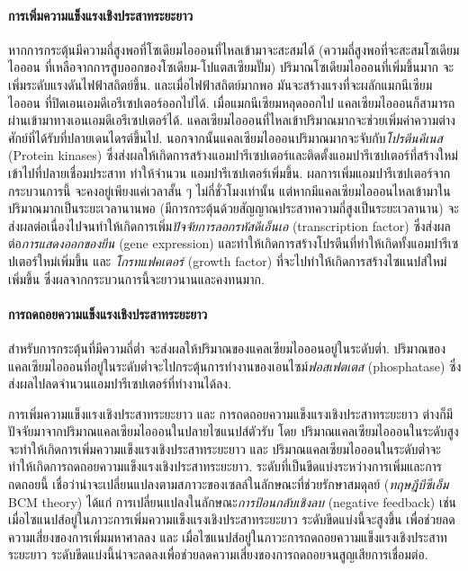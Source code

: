{\begin{shaded}
		\paragraph{\small การเพิ่มความแข็งแรงเชิงประสาทระยะยาว}
		หากการกระตุ้นมีความถี่สูงพอที่โซเดียมไอออนที่ไหลเข้ามาจะสะสมได้ (ความถี่สูงพอที่จะสะสมโซเดียมไอออน ที่เหลือจากการสูบออกของโซเดียม-โปแตสเซียมปั๊ม)
		ปริมาณโซเดียมไอออนที่เพิ่มขึ้นมาก จะเพิ่มระดับแรงดันไฟฟ้าสถิตย์ขึ้น. 
		และเมื่อไฟฟ้าสถิตย์มากพอ มันจะสร้างแรงที่จะผลักแมกนีเซียมไอออน ที่ปิดเอนเอมดีเอรีเซปเตอร์ออกไปได้.
		เมื่อแมกนีเซียมหลุดออกไป แคลเซียมไอออนก็สามารถผ่านเข้ามาทางเอนเอมดีเอรีเซปเตอร์ได้.
		แคลเซียมไอออนที่ไหลเข้าปริมาณมากจะช่วยเพิ่มค่าความต่างศักย์ที่ได้รับที่ปลายเดนไดรต์ขึ้นไป.
		นอกจากนั้นแคลเซียมไอออนปริมาณมากจะจับกับ\textit{โปรตีนคีเนส} (Protein kinases) ซึ่งส่งผลให้เกิดการสร้างแอมปารีเซปเตอร์และติดตั้งแอมปารีเซปเตอร์ที่สร้างใหม่
		เข้าไปที่ปลายเชื่อมประสาท
		ทำให้จำนวน แอมปารีเซปเตอร์เพิ่มขึ้น.
		ผลการเพิ่มแอมปารีเซปเตอร์จากกระบวนการนี้
		จะคงอยู่เพียงแค่เวลาสั้น ๆ ไม่กี่ชั่วโมงเท่านั้น
		แต่หากมีแคลเซียมไอออนไหลเข้ามาในปริมาณมากเป็นระยะเวลานานพอ (มีการกระตุ้นด้วยสัญญาณประสาทความถี่สูงเป็นระยะเวลานาน) จะส่งผลต่อเนื่องไปจนทำให้เกิดการเพิ่ม\textit{ปัจจัยการลอกรหัสดีเอ็นเอ} (transcription factor) ซึ่งส่งผลต่อ\textit{การแสดงออกของยีน} (gene expression) และทำให้เกิดการสร้างโปรตีนที่ทำให้เกิดทั้งแอมปารีเซปเตอร์ใหม่เพิ่มขึ้น และ \textit{โกรทแฟคเตอร์} (growth factor) ที่จะไปทำให้เกิดการสร้างไซแนปส์ใหม่เพิ่มขึ้น ซึ่งผลจากกระบวนการนี้จะยาวนานและคงทนมาก.
		
		\paragraph{\small การถดถอยความแข็งแรงเชิงประสาทระยะยาว}
		สำหรับการกระตุ้นที่มีความถี่ต่ำ จะส่งผลให้ปริมาณของแคลเซียมไอออนอยู่ในระดับต่ำ.
		ปริมาณของแคลเซียมไอออนที่อยู่ในระดับต่ำจะไปกระตุ้นการทำงานของเอนไซม์\textit{ฟอสเฟตเตส} (phosphatase)
		ซึ่งส่งผลไปลดจำนวนแอมปารีเซปเตอร์ที่ทำงานได้ลง.
		
		การเพิ่มความแข็งแรงเชิงประสาทระยะยาว และ การถดถอยความแข็งแรงเชิงประสาทระยะยาว ต่างก็มีปัจจัยมาจากปริมาณแคลเซียมไอออนในปลายไซแนปส์ตัวรับ
		โดย ปริมาณแคลเซียมไอออนในระดับสูงจะทำให้เกิดการเพิ่มความแข็งแรงเชิงประสาทระยะยาว
		และ ปริมาณแคลเซียมไอออนในระดับต่ำจะทำให้เกิดการถดถอยความแข็งแรงเชิงประสาทระยะยาว.
		ระดับที่เป็นขีดแบ่งระหว่างการเพิ่มและการถดถอยนี้
		เชื่อว่าน่าจะเปลี่ยนแปลงตามสภาวะของเซลล์ในลักษณะที่ช่วยรักษาสมดุลย์
		(\textit{ทฤษฎีบีซีเอ็ม} BCM theory\cite{BCM1982})
		ได้แก่
		การเปลี่ยนแปลงในลักษณะ\textit{การป้อนกลับเชิงลบ} (negative feedback)
		เช่น
		เมื่อไซแนปส์อยู่ในภาวะการเพิ่มความแข็งแรงเชิงประสาทระยะยาว ระดับขีดแบ่งนี้จะสูงขึ้น
		เพื่อช่วยลดความเสี่ยงของการเพิ่มมหาศาลลง
		และ เมื่อไซแนปส์อยู่ในภาวะการถดถอยความแข็งแรงเชิงประสาทระยะยาว ระดับขีดแบ่งนี้น่าจะลดลงเพื่อช่วยลดความเสี่ยงของการถดถอยจนสูญเสียการเชื่อมต่อ.
		

\end{shaded}}
